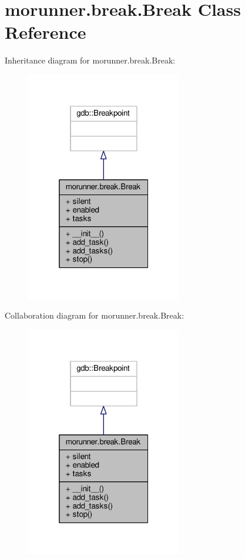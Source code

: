 \hypertarget{classmorunner_1_1break_1_1Break}{}\section{morunner.\+break.\+Break Class Reference}
\label{classmorunner_1_1break_1_1Break}


Inheritance diagram for morunner.\+break.\+Break\+:
\nopagebreak
\begin{figure}[H]
\begin{center}
\leavevmode
\includegraphics[width=193pt]{classmorunner_1_1break_1_1Break__inherit__graph}
\end{center}
\end{figure}


Collaboration diagram for morunner.\+break.\+Break\+:
\nopagebreak
\begin{figure}[H]
\begin{center}
\leavevmode
\includegraphics[width=193pt]{classmorunner_1_1break_1_1Break__coll__graph}
\end{center}
\end{figure}
